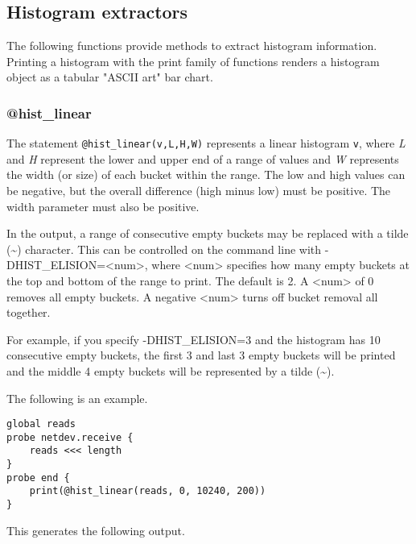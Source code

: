\documentclass[twoside,english]{article}
\newenvironment{vindent}
{\begin{list}{}{\setlength{\listparindent}{6pt}}
\item[]}
{\end{list}}
\begin{document}
\subsection{Histogram extractors}
The following functions provide methods to extract histogram information.
Printing a histogram with the print family of functions renders a histogram
object as a tabular "ASCII art" bar chart.

\subsubsection{@hist\_linear}
The statement \texttt{@hist\_linear(v,L,H,W)} represents a linear histogram
\texttt{v}, where \emph{L} and \emph{H} represent the lower and upper end of
a range of values and \emph{W} represents the width (or size) of each bucket
within the range.  The low and high values can be negative, but the overall
difference (high minus low) must be positive. The width parameter must also
be positive.

In the output, a range of consecutive empty buckets may be replaced with a tilde
(\textasciitilde{}) character.  This can be controlled on the command line
with -DHIST\_ELISION=\textless\hspace{1 sp}num\textgreater\hspace{1 sp},
where \textless\hspace{1 sp}num\textgreater\hspace{1 sp} specifies how many
empty buckets at the top and bottom of the range to print.
The default is 2.  A \textless\hspace{1 sp}num\textgreater\hspace{1 sp} of 0
removes all empty buckets. A negative \textless\hspace{1 sp}num\textgreater\hspace{1 sp}
turns off bucket removal all together.

For example, if you specify -DHIST\_ELISION=3 and the histogram has 10 
consecutive empty buckets, the first 3 and last 3 empty buckets will
be printed and the middle 4 empty buckets will be represented by a
tilde (\textasciitilde{}).

The following is an example.

\begin{vindent}
\begin{verbatim}
global reads
probe netdev.receive {
    reads <<< length
}
probe end {
    print(@hist_linear(reads, 0, 10240, 200))
}
\end{verbatim}
\end{vindent}
This generates the following output.
\end{document}
